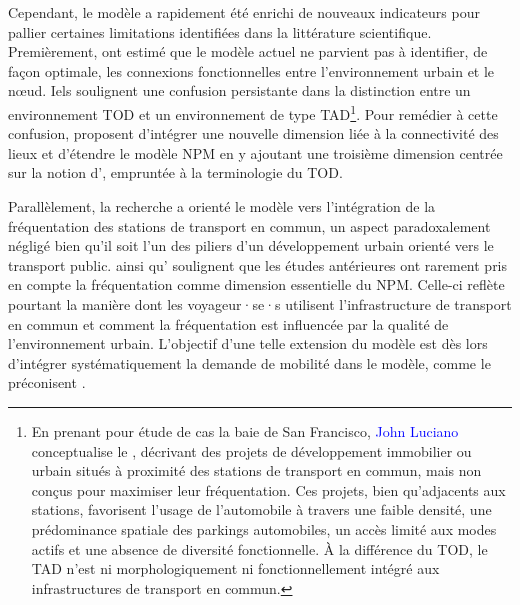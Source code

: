 \begin{refsegment}
Cependant, le modèle a rapidement été enrichi de nouveaux indicateurs pour pallier certaines limitations identifiées dans la littérature scientifique. Premièrement, \textcolor{blue}{\textcite[4-5]{zhang_make_2023}} ont estimé que le modèle actuel ne parvient pas à identifier, de façon optimale, les connexions fonctionnelles entre l'environnement urbain et le nœud. Iels soulignent une confusion persistante dans la distinction entre un environnement \acrshort{TOD} et un environnement de type \acrfull{TAD}\footnote{
    En prenant pour étude de cas la baie de San Francisco, \textcolor{blue}{John Luciano} \textcolor{blue}{\textcite[3]{renne_transit-adjacent_2009}} conceptualise le , décrivant des projets de développement immobilier ou urbain situés à proximité des stations de transport en commun, mais non conçus pour maximiser leur fréquentation. Ces projets, bien qu'adjacents aux stations, favorisent l'usage de l'automobile à travers une faible densité, une prédominance spatiale des parkings automobiles, un accès limité aux \gls{modes actifs} et une absence de diversité fonctionnelle. À la différence du \acrshort{TOD}, le \acrshort{TAD} n'est ni morphologiquement ni fonctionnellement intégré aux infrastructures de transport en commun.
}. Pour remédier à cette confusion, \textcolor{blue}{\textcite[271]{li_transit_2019}} proposent d'intégrer une nouvelle dimension liée à la connectivité des lieux et d'étendre le modèle \acrshort{NPM} en y ajoutant une troisième dimension centrée sur la notion d', empruntée à la terminologie du \acrshort{TOD}.%

Parallèlement, la recherche a orienté le modèle vers l'intégration de la fréquentation des stations de transport en commun, un aspect paradoxalement négligé bien qu'il soit l'un des piliers d'un développement urbain orienté vers le transport public. \textcolor{blue}{\textcite[2]{cao_coordination_2020}} ainsi qu'\textcolor{blue}{\textcite[3]{amini_pishro_node_2022}} soulignent que les études antérieures ont rarement pris en compte la fréquentation comme dimension essentielle du \acrshort{NPM}. Celle-ci reflète pourtant la manière dont les voyageur·se·s utilisent l'infrastructure de transport en commun et comment la fréquentation est influencée par la qualité de l'environnement urbain. L'objectif d'une telle extension du modèle est dès lors d'intégrer systématiquement la demande de mobilité dans le modèle, comme le préconisent \textcolor{blue}{\textcite[2]{liao_evaluating_2022}}.%


\end{refsegment}
